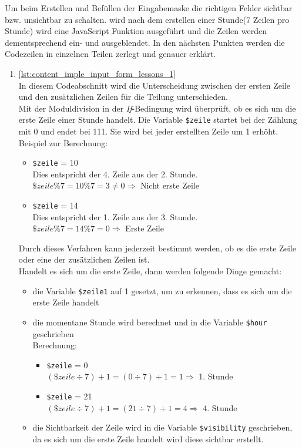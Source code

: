 Um beim Erstellen und Befüllen der Eingabemaske die richtigen Felder sichtbar bzw. unsichtbar zu schalten. wird nach dem erstellen einer Stunde(7 Zeilen pro Stunde) wird eine JavaScript Funktion ausgeführt und die Zeilen werden dementsprechend ein- und ausgeblendet.
In den nächsten Punkten werden die Codezeilen in einzelnen Teilen zerlegt und genauer erklärt.
\begin{enumerate}

	\item \autoref{lst:content_imple_input_form_lessons_1}\\
	In diesem Codeabschnitt wird die Unterscheidung zwischen der ersten Zeile und den zusätzlichen Zeilen für die Teilung unterschieden.\\
	Mit der Moduldivision in der \textit{If}-Bedingung wird überprüft, ob es sich um die erste Zeile einer Stunde handelt. Die Variable \texttt{\$zeile} startet bei der Zählung mit 0 und endet bei 111. Sie wird bei jeder erstellten Zeile um 1 erhöht.\\
	Beispiel zur Berechnung:
	
	\begin{itemize}
		\item \texttt{\$zeile} = 10\\
		Dies entspricht der 4. Zeile aus der 2. Stunde.\\
		$ \$zeile \% 7 = 10 \% 7 = 3 \ne 0 \Rightarrow $ Nicht erste Zeile
		\item \texttt{\$zeile} = 14\\
		Dies entspricht der 1. Zeile aus der 3. Stunde.\\
		$ \$zeile \% 7 = 14 \% 7 = 0 \Rightarrow $ Erste Zeile
	\end{itemize}
	
	Durch dieses Verfahren kann jederzeit bestimmt werden, ob es die erste Zeile oder eine der zusätzlichen Zeilen ist.\\
	Handelt es sich um die erste Zeile, dann werden folgende Dinge gemacht:
	
	\begin{itemize}
		\item die Variable \texttt{\$zeile1} auf 1 gesetzt, um zu erkennen, dass es sich um die erste Zeile handelt
		\item die momentane Stunde wird berechnet und in die Variable \texttt{\$hour} geschrieben\\
		Berechnung:
		\begin{itemize}
			\item \texttt{\$zeile} = 0\\
			$ (\$zeile \div 7) + 1 = ( 0 \div 7 ) + 1 = 1 \Rightarrow $ 1. Stunde
			\item \texttt{\$zeile} = 21\\
			$ (\$zeile \div 7) + 1 = ( 21 \div 7 ) + 1 = 4 \Rightarrow $ 4. Stunde\\
		\end{itemize}
		\item die Sichtbarkeit der Zeile wird in die Variable \texttt{\$visibility} geschrieben, da es sich um die erste Zeile handelt wird diese sichtbar erstellt.
	\end{itemize}
	

\end{enumerate}
